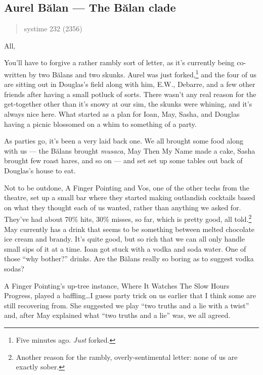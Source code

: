 \hypertarget{aurel-bux103lan-the-bux103lan-clade}{%
\subsection{Aurel Bălan — The Bălan clade}\label{aurel-bux103lan-the-bux103lan-clade}}

\begin{quote}
systime 232 (2356)
\end{quote}

All,

You'll have to forgive a rather rambly sort of letter, as it's currently being co-written by two Bălans and two skunks. Aurel was just forked,\footnote{Five minutes ago. \emph{Just} forked.} and the four of us are sitting out in Douglas's field along with him, E.W., Debarre, and a few other friends after having a small potluck of sorts. There wasn't any real reason for the get-together other than it's snowy at our sim, the skunks were whining, and it's always nice here. What started as a plan for Ioan, May, Sasha, and Douglas having a picnic blossomed on a whim to something of a party.

As parties go, it's been a very laid back one. We all brought some food along with us — the Bălans brought \emph{musaca}, May Then My Name made a cake, Sasha brought few roast hares, and so on — and set set up some tables out back of Douglas's house to eat.

Not to be outdone, A Finger Pointing and Vos, one of the other techs from the theatre, set up a small bar where they started making outlandish cocktails based on what they thought each of us wanted, rather than anything we asked for. They've had about 70\% hits, 30\% misses, so far, which is pretty good, all told.\footnote{Another reason for the rambly, overly-sentimental letter: none of us are exactly sober.} May currently has a drink that seems to be something between melted chocolate ice cream and brandy. It's quite good, but so rich that we can all only handle small sips of it at a time. Ioan got stuck with a vodka and soda water. One of those ``why bother?'' drinks. Are the Bălans really so boring as to suggest vodka sodas?

A Finger Pointing's up-tree instance, Where It Watches The Slow Hours Progress, played a baffling\ldots I guess party trick on us earlier that I think some are still recovering from. She suggested we play ``two truths and a lie with a twist'' and, after May explained what ``two truths and a lie'' was, we all agreed.

